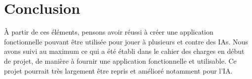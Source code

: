 \section{Conclusion}

À partir de ces éléments, pensons avoir réussi à créer une application fonctionnelle pouvant être utilisée pour jouer à plusieurs et contre des IAs. Nous avons suivi au maximum ce qui a été établi dans le cahier des charges en début de projet, de manière à fournir une application fonctionnelle et utilisable. Ce projet pourrait très largement être repris et amélioré notamment pour l'IA.
